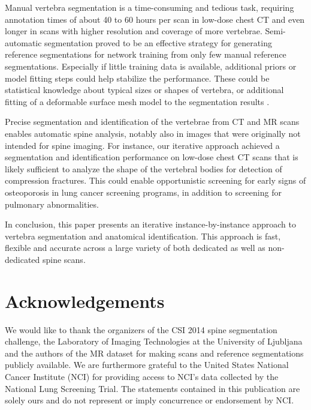 \documentclass[authoryear,5p,final,times]{elsarticle}
\begin{document}
    Manual vertebra segmentation is a time-consuming and tedious task, requiring annotation times of about 40 to 60 hours per scan in low-dose chest CT and even longer in scans with higher resolution and coverage of more vertebrae. Semi-automatic segmentation proved to be an effective strategy for generating reference segmentations for network training from only few manual reference segmentations. Especially if little training data is available, additional priors or model fitting steps could help stabilize the performance. These could be statistical knowledge about typical sizes or shapes of vertebra, or additional fitting of a deformable surface mesh model to the segmentation results \citep{Korez2016}.
    
    Precise segmentation and identification of the vertebrae from CT and MR scans enables automatic spine analysis, notably also in images that were originally not intended for spine imaging. For instance, our iterative approach achieved a segmentation and identification performance on low-dose chest CT scans that is likely sufficient to analyze the shape of the vertebral bodies for detection of compression fractures. This could enable opportunistic screening for early signs of osteoporosis in lung cancer screening programs, in addition to screening for pulmonary abnormalities.
    
    In conclusion, this paper presents an iterative instance-by-instance approach to vertebra segmentation and anatomical identification. This approach is fast, flexible and accurate across a large variety of both dedicated as well as non-dedicated spine scans.
        
    \section*{Acknowledgements}
    
    \noindent   
    We would like to thank the organizers of the CSI 2014 spine segmentation challenge, the Laboratory of Imaging Technologies at the University of Ljubljana and the authors of the MR dataset for making scans and reference segmentations publicly available. We are furthermore grateful to the United States National Cancer Institute (NCI) for providing access to NCI’s data collected by the National Lung Screening Trial. The statements contained in this publication are solely ours and do not represent or imply concurrence or endorsement by NCI.
    
\end{document}
